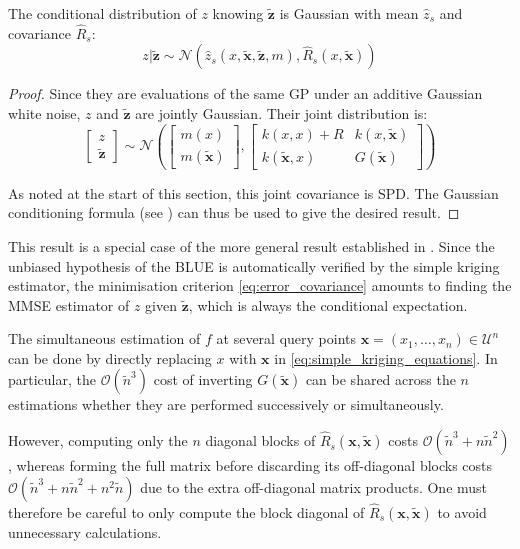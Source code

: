 \begin{proposition}\label{th:simple_kriging_conditional}
	The conditional distribution of $z$ knowing $\tilde{\mathbf{z}}$ is Gaussian with mean $\hat{z}_s$ and covariance $\hat{R}_s$:
	\begin{equation}
		z|\tilde{\mathbf{z}}\sim\mathcal{N}\left(\hat{z}_s(x,\tilde{\mathbf{x}},\tilde{\mathbf{z}},m),\hat{R}_s(x,\tilde{\mathbf{x}})\right)
	\end{equation}
\end{proposition}

\begin{proof}
	Since they are evaluations of the same GP under an additive Gaussian white noise, $z$ and $\tilde{\mathbf{z}}$ are jointly Gaussian. Their joint distribution is:
	\begin{equation}
		\begin{bmatrix}
		z\\\tilde{\mathbf{z}}
		\end{bmatrix}\sim\mathcal{N}\left(\begin{bmatrix}
		m(x)\\m(\tilde{\mathbf{x}})
		\end{bmatrix},\begin{bmatrix}
		k(x,x)+R&k(x,\tilde{\mathbf{x}})\\k(\tilde{\mathbf{x}},x)&G(\tilde{\mathbf{x}})
		\end{bmatrix}\right)
	\end{equation}

	As noted at the start of this section, this joint covariance is SPD. The Gaussian conditioning formula (see ) can thus be used to give the desired result.
\end{proof}

This result is a special case of the more general result established in . Since the unbiased hypothesis of the BLUE is automatically verified by the simple kriging estimator, the minimisation criterion \eqref{eq:error_covariance} amounts to finding the MMSE estimator of $z$ given $\tilde{\mathbf{z}}$, which is always the conditional expectation.

\begin{remark}
	The simultaneous estimation of $f$ at several query points $\mathbf{x}=(x_1,\dots,x_n)\in\mathcal{U}^n$ can be done by directly replacing $x$ with $\mathbf{x}$ in \eqref{eq:simple_kriging_equations}. In particular, the $\mathcal{O}\left(\tilde{n}^3\right)$ cost of inverting $G(\tilde{\mathbf{x}})$ can be shared across the $n$ estimations whether they are performed successively or simultaneously.

	However, computing only the $n$ diagonal blocks of $\hat{R}_s(\mathbf{x},\tilde{\mathbf{x}})$ costs $\mathcal{O}(\tilde{n}^3+n\tilde{n}^2)$, whereas forming the full matrix before discarding its off-diagonal blocks costs $\mathcal{O}(\tilde{n}^3+n\tilde{n}^2+n^2\tilde{n})$ due to the extra off-diagonal matrix products. One must therefore be careful to only compute the block diagonal of $\hat{R}_s(\mathbf{x},\tilde{\mathbf{x}})$ to avoid unnecessary calculations.
\end{remark}


